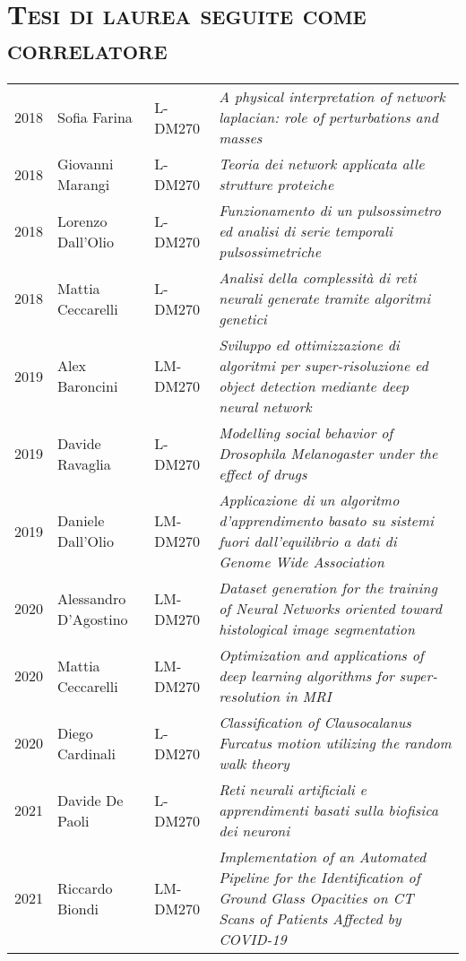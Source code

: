 \documentclass[a4paper,11pt]{article}
\begin{document}
\vspace*{0.5cm}
\section*{\scshape{Tesi di laurea seguite come correlatore}}

\begin{tabular}{lllp{9cm}}

  2018 & Sofia Farina          & L-DM270  & \emph{A physical interpretation of network laplacian: role of perturbations and masses}\\
  2018 & Giovanni Marangi      & L-DM270  & \emph{Teoria dei network applicata alle strutture proteiche}\\
  2018 & Lorenzo Dall'Olio     & L-DM270  & \emph{Funzionamento di un pulsossimetro ed analisi di serie temporali pulsossimetriche}\\
  2018 & Mattia Ceccarelli     & L-DM270  & \emph{Analisi della complessità di reti neurali generate tramite algoritmi genetici}\\
  2019 & Alex Baroncini        & LM-DM270 & \emph{Sviluppo ed ottimizzazione di algoritmi per super-risoluzione ed object detection mediante deep neural network}\\
  2019 & Davide Ravaglia       & L-DM270  & \emph{Modelling social behavior of Drosophila Melanogaster under the effect of drugs}\\
  2019 & Daniele Dall'Olio     & LM-DM270 & \emph{Applicazione di un algoritmo d’apprendimento basato su sistemi fuori dall’equilibrio a dati di Genome Wide Association}\\
  2020 & Alessandro D'Agostino & LM-DM270 & \emph{Dataset generation for the training of Neural Networks oriented toward histological image segmentation}\\
  2020 & Mattia Ceccarelli     & LM-DM270 & \emph{Optimization and applications of deep learning algorithms for super-resolution in MRI}\\
  2020 & Diego Cardinali       & L-DM270  & \emph{Classification of Clausocalanus Furcatus motion utilizing the random walk theory}\\
  2021 & Davide De Paoli       & L-DM270  & \emph{Reti neurali artificiali e apprendimenti basati sulla biofisica dei neuroni}\\
  2021 & Riccardo Biondi       & LM-DM270 & \emph{Implementation of an Automated Pipeline for the Identification of Ground Glass Opacities on CT Scans of Patients Affected by COVID-19}\\

\end{tabular}
\end{document}
